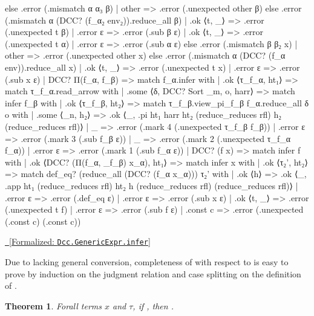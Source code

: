 \documentclass{article}
\newcommand{\lean}[1]{\EscVerb{#1}}
\newtheorem{theorem}{Theorem}
\newcommand{\leanlink}[2]{
  \hfill \href{#1}{\textcolor{leanblue}\faCheckSquare~[Formalized: \texttt{#2}]}%
}
\begin{document}
\begin{leancode}
                    else .error (.mismatch α α₃ β)
                  | other => .error (.unexpected other β)
                else .error (.mismatch α (DCC? (f_α₂ env₂)).reduce_all β)
              | .ok ⟨t, _⟩ => .error (.unexpected t β)
              | .error ε => .error (.sub β ε)
            | .ok ⟨t, _⟩ => .error (.unexpected t α)
            | .error ε => .error (.sub α ε)
          else .error (.mismatch β β₂ x)
        | other => .error (.unexpected other x)
      else .error (.mismatch α (DCC? (f_α env)).reduce_all x)
    | .ok ⟨t, _⟩ => .error (.unexpected t x)
    | .error ε => .error (.sub x ε)
  | DCC? Π(f_α, f_β) =>
    match f_α.infer with
    | .ok ⟨τ_f_α, ht₁⟩ =>
      match τ_f_α.read_arrow with
      | .some ⟨δ, DCC? Sort _m, o, harr⟩ =>
        match infer f_β with
        | .ok ⟨τ_f_β, ht₂⟩ =>
          match τ_f_β.view_pi_f_β f_α.reduce_all δ o with
          | .some ⟨_n, h₂⟩ =>
            .ok ⟨_, .pi ht₁ harr ht₂ (reduce_reduces rfl) h₂ (reduce_reduces rfl)⟩
          | _ => .error (.mark 4 (.unexpected τ_f_β f_β))
        | .error ε => .error (.mark 3 (.sub f_β ε))
      | _ => .error (.mark 2 (.unexpected τ_f_α f_α))
    | .error ε => .error (.mark 1 (.sub f_α ε))
  | DCC? (f x) =>
    match infer f with
    | .ok ⟨DCC? (Π(f_α, _f_β) x_α), ht₁⟩ =>
      match infer x with
      | .ok ⟨τ₂', ht₂⟩ =>
        match def_eq? (reduce_all (DCC? (f_α x_α))) τ₂' with
        | .ok ⟨h⟩ =>
          .ok ⟨_, .app ht₁ (reduce_reduces rfl) ht₂ h (reduce_reduces rfl) (reduce_reduces rfl)⟩
        | .error ε => .error (.def_eq ε)
      | .error ε => .error (.sub x ε)
    | .ok ⟨t, _⟩ => .error (.unexpected t f)
    | .error ε => .error (.sub f ε)
  | .const c => .error (.unexpected (.const c) (.const c))
\end{leancode}

\noindent \hfill\leanlink{https://github.com/lexzaiello/DCC/blob/0c0d1e06e022b0f7d11b2182cd9ce027add2dc45/Dcc/Judge3.lean\#L372}{Dcc.GenericExpr.infer}

Due to lacking general conversion, completeness of \lean{infer} with respect to \lean{Judge} is easy to prove by induction on the judgment relation and case splitting on the definition of \lean{infer}.

\begin{theorem}\label{judgecomplete}
  Forall terms \(x\) and \(\tau\), if \lean{h : Judge e τ}, then \lean{infer e = ok ⟨τ, h⟩}.
\end{theorem}
\end{document}
